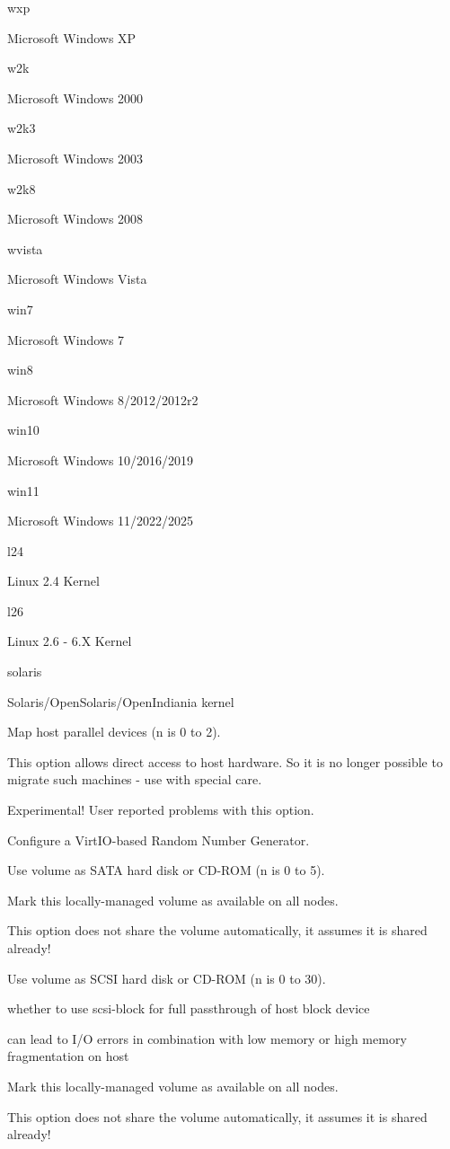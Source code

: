 wxp

Microsoft Windows XP

w2k

Microsoft Windows 2000

w2k3

Microsoft Windows 2003

w2k8

Microsoft Windows 2008

wvista

Microsoft Windows Vista

win7

Microsoft Windows 7

win8

Microsoft Windows 8/2012/2012r2

win10

Microsoft Windows 10/2016/2019

win11

Microsoft Windows 11/2022/2025

l24

Linux 2.4 Kernel

l26

Linux 2.6 - 6.X Kernel

solaris

Solaris/OpenSolaris/OpenIndiania kernel

Map host parallel devices (n is 0 to 2).

This option allows direct access to host hardware. So it is no longer possible to migrate such machines - use with special care.

Experimental! User reported problems with this option.

Configure a VirtIO-based Random Number Generator.

Use volume as SATA hard disk or CD-ROM (n is 0 to 5).

Mark this locally-managed volume as available on all nodes.

This option does not share the volume automatically, it assumes it is shared already!

Use volume as SCSI hard disk or CD-ROM (n is 0 to 30).

whether to use scsi-block for full passthrough of host block device

can lead to I/O errors in combination with low memory or high memory fragmentation on host

Mark this locally-managed volume as available on all nodes.

This option does not share the volume automatically, it assumes it is shared already!

